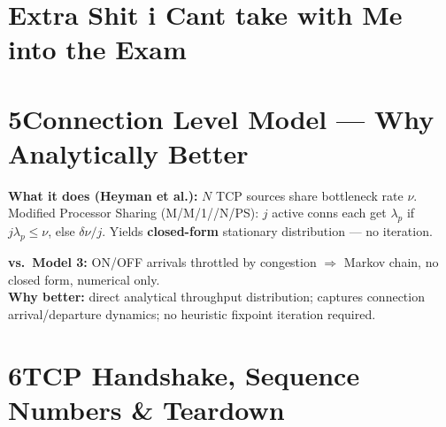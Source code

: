 \documentclass[10pt,a4paper]{article}
\begin{document}
\vspace{4pt}
\clearpage
\section{Extra Shit i Cant take with Me into the Exam}
\section*{5\quad Connection Level Model --- Why Analytically Better}

\vspace{0pt}
\begin{minipage}[t]{0.48\textwidth}
\vspace{0pt}
\begin{keybox}
\small\textbf{What it does (Heyman et al.):} $N$ TCP sources share bottleneck rate $\nu$. Modified Processor Sharing (M/M/1//N/PS): $j$ active conns each get $\lambda_p$ if $j\lambda_p \leq \nu$, else $\delta\nu/j$. Yields \textbf{closed-form} stationary distribution --- no iteration.
\end{keybox}
\end{minipage}\hfill
\begin{minipage}[t]{0.48\textwidth}
\vspace{0pt}
\begin{notebox}
\small\textbf{vs.\ Model 3:} ON/OFF arrivals throttled by congestion $\Rightarrow$ Markov chain, no closed form, numerical only.\\[2pt]
\textbf{Why better:} direct analytical throughput distribution; captures connection arrival/departure dynamics; no heuristic fixpoint iteration required.
\end{notebox}
\end{minipage}

\vspace{4pt}

\section*{6\quad TCP Handshake, Sequence Numbers \& Teardown}
\end{document}
